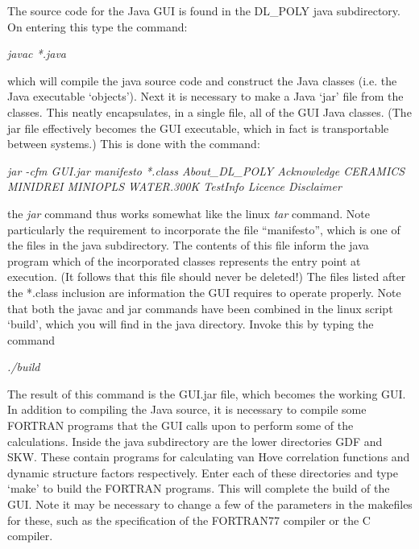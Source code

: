 The source code for the Java GUI is found in the DL\_POLY java subdirectory.
On entering this type the command:

\vspace{0.25cm}
{\em javac *.java}
\vspace{0.25cm}

\noindent
which will compile the java source code and construct the Java classes
(i.e. the Java executable ‘objects’). Next it is necessary to make a Java
‘jar’ file from the classes. This neatly encapsulates, in a single file, all
of the GUI Java classes. (The jar file effectively becomes the GUI 
executable, which in fact is transportable between
systems.) This is done with the command:

\vspace{0.25cm}
{\em jar -cfm GUI.jar manifesto *.class About\_DL\_POLY Acknowledge
CERAMICS MINIDREI  MINIOPLS WATER.300K TestInfo Licence Disclaimer}
\vspace{0.25cm}

\noindent
the {\em jar} command thus works somewhat like the linux {\em tar} command. Note
particularly the requirement to incorporate the file ``manifesto'', which is
one of the files in the java subdirectory. The contents of this file inform
the java program which of the incorporated classes represents the entry point
at execution. (It follows that this file should never be deleted!) The files
listed after the *.class inclusion are information the GUI requires to operate
properly. Note that both the javac and jar commands have been combined in the
linux script `build’, which you will find in the java directory.  Invoke this
by typing the command

\vspace{0.25cm}
{\em ./build}
\vspace{0.25cm}

\noindent
The result of this command is the GUI.jar file, which becomes the working
GUI. In addition to compiling the Java source, it is necessary to compile some
FORTRAN programs that the GUI calls upon to perform some of the
calculations. Inside the java subdirectory are the lower directories GDF and
SKW. These contain programs for calculating van Hove correlation functions and
dynamic structure factors respectively. Enter each of these directories and
type `make’ to build the FORTRAN
programs. This will complete the build of the GUI. Note it may be necessary to
change a few of the parameters in the makefiles for these, such as the
specification of the FORTRAN77 compiler or the C compiler.

